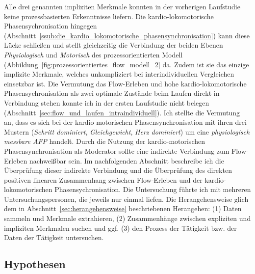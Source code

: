 Alle drei genannten impliziten Merkmale konnten in der vorherigen Laufstudie keine prozessbasierten Erkenntnisse liefern. Die kardio-lokomotorische Phasensychronisation hingegen (Abschnitt~\ref{ssub:die_kardio_lokomotorische_phasensynchronisation}) kann diese Lücke schließen und stellt gleichzeitig die Verbindung der beiden Ebenen \emph{Physiologisch} und \emph{Motorisch} des prozessorientierten Modell (Abbildung~\ref{fig:prozessorientiertes_flow_modell_2} da. Zudem ist sie das einzige implizite Merkmale, welches unkompliziert bei interindividuellen Vergleichen einsetzbar ist. Die Vermutung das Flow-Erleben und hohe kardio-lokomotorische Phasensychronisation als zwei optimale Zustände beim Laufen direkt in Verbindung stehen konnte ich in der ersten Laufstudie nicht belegen (Abschnitt~\ref{sec:flow_und_laufen_intraindividuell}). Ich stellte die Vermutung an, dass es sich bei der kardio-motorischen Phasensynchronisation mit ihren drei Mustern (\emph{Schritt dominiert}, \emph{Gleichgewicht}, \emph{Herz dominiert}) um eine \emph{physiologisch messbare \ac{AFP}} handelt. Durch die Nutzung der kardio-motorischen Phasensynchronisation als Moderator sollte eine indirekte Verbindung zum Flow-Erleben nachweißbar sein. Im nachfolgenden Abschnitt beschreibe ich die Überprüfung dieser indirekte Verbindung und die Überprüfung des direkten positiven linearen Zusammenhang zwischen Flow-Erleben und der kardio-lokomotorischen Phasensychronisation. Die Untersuchung führte ich mit mehreren Untersuchungspersonen, die jeweils nur einmal liefen. Die Herangehensweise glich dem in Abschnitt~\ref{sec:herangehensweise} beschriebenen Herangehen: (1) Daten sammeln und Merkmale extrahieren, (2) Zusammenhänge zwischen expliziten und impliziten Merkmalen suchen und ggf. (3) den Prozess der Tätigkeit bzw. der Daten der Tätigkeit untersuchen. 

\subsection{Hypothesen} 

\label{sub:hypothesen}

